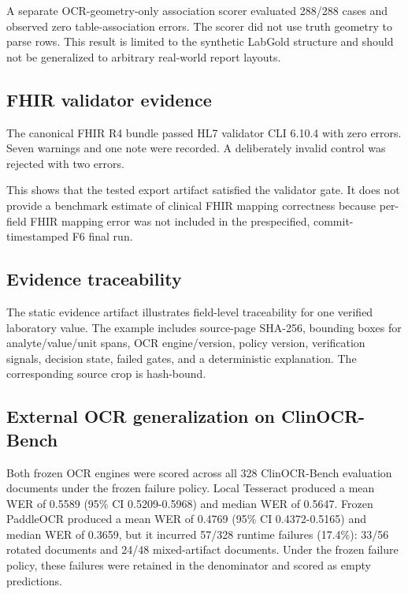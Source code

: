 \documentclass[10pt]{article}
\begin{document}
A separate OCR-geometry-only association scorer evaluated 288/288 cases and observed zero table-association errors. The scorer did not use truth geometry to parse rows. This result is limited to the synthetic LabGold structure and should not be generalized to arbitrary real-world report layouts.

\subsection{FHIR validator evidence}

The canonical FHIR R4 bundle passed HL7 validator CLI 6.10.4 with zero errors. Seven warnings and one note were recorded. A deliberately invalid control was rejected with two errors.

This shows that the tested export artifact satisfied the validator gate. It does not provide a benchmark estimate of clinical FHIR mapping correctness because per-field FHIR mapping error was not included in the prespecified, commit-timestamped F6 final run.

\subsection{Evidence traceability}

The static evidence artifact illustrates field-level traceability for one verified laboratory value. The example includes source-page SHA-256, bounding boxes for analyte/value/unit spans, OCR engine/version, policy version, verification signals, decision state, failed gates, and a deterministic explanation. The corresponding source crop is hash-bound.

\subsection{External OCR generalization on ClinOCR-Bench}

Both frozen OCR engines were scored across all 328 ClinOCR-Bench evaluation documents under the frozen failure policy. Local Tesseract produced a mean WER of 0.5589 (95\% CI 0.5209-0.5968) and median WER of 0.5647. Frozen PaddleOCR produced a mean WER of 0.4769 (95\% CI 0.4372-0.5165) and median WER of 0.3659, but it incurred 57/328 runtime failures (17.4\%): 33/56 rotated documents and 24/48 mixed-artifact documents. Under the frozen failure policy, these failures were retained in the denominator and scored as empty predictions.
\end{document}
